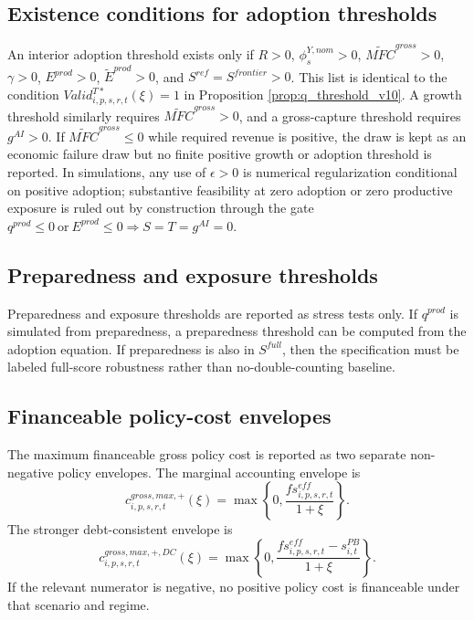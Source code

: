 \documentclass[11pt,a4paper]{article}
\begin{document}
\subsection{Existence conditions for adoption thresholds}\label{subsec:adoption_threshold_existence}

An interior adoption threshold exists only if $R>0$, $\phi^{Y,nom}_s>0$, $\widetilde{MFC}^{gross}>0$, $\gamma>0$, $E^{prod}>0$, $\tilde E^{prod}>0$, and $S^{ref}=S^{frontier}>0$. This list is identical to the condition $Valid^{T*}_{i,p,s,r,t}(\xi)=1$ in Proposition \ref{prop:q_threshold_v10}. A growth threshold similarly requires $\widetilde{MFC}^{gross}>0$, and a gross-capture threshold requires $g^{AI}>0$. If $\widetilde{MFC}^{gross}\leq0$ while required revenue is positive, the draw is kept as an economic failure draw but no finite positive growth or adoption threshold is reported. In simulations, any use of $\epsilon>0$ is numerical regularization conditional on positive adoption; substantive feasibility at zero adoption or zero productive exposure is ruled out by construction through the gate $q^{prod}\leq0\ \text{or}\ E^{prod}\leq0\Rightarrow S=T=g^{AI}=0$.

\subsection{Preparedness and exposure thresholds}

Preparedness and exposure thresholds are reported as stress tests only. If $q^{prod}$ is simulated from preparedness, a preparedness threshold can be computed from the adoption equation. If preparedness is also in $S^{full}$, then the specification must be labeled full-score robustness rather than no-double-counting baseline.

\subsection{Financeable policy-cost envelopes}

The maximum financeable gross policy cost is reported as two separate non-negative policy envelopes. The marginal accounting envelope is
\begin{equation}\label{eq:cmax_main_v17}
    c^{gross,max,+}_{i,p,s,r,t}(\xi)=\max\left\{0,\frac{fs^{eff}_{i,p,s,r,t}}{1+\xi}\right\}.
\end{equation}
The stronger debt-consistent envelope is
\begin{equation}\label{eq:cmax_dc_main_v22}
    c^{gross,max,+,DC}_{i,p,s,r,t}(\xi)=\max\left\{0,\frac{fs^{eff}_{i,p,s,r,t}-s^{PB}_{i,t}}{1+\xi}\right\}.
\end{equation}
If the relevant numerator is negative, no positive policy cost is financeable under that scenario and regime.
\end{document}
